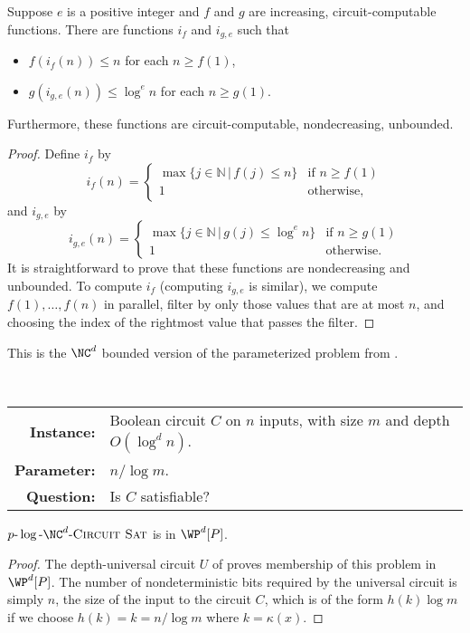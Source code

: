 \documentclass{article}
\newcommand{\dash}{\textnormal{-}}
\newcommand{\pncsat}{p\dash\log\dash\NC^d\dash\textsc{Circuit Sat}}
\begin{document}
\begin{lemma}\label{lem:i}
  Suppose $e$ is a positive integer and $f$ and $g$ are increasing, circuit-computable functions.
  There are functions $i_f$ and $i_{g, e}$ such that
  \begin{itemize}
  \item $f(i_f(n)) \leq n$ for each $n \geq f(1)$,
  \item $g(i_{g, e}(n)) \leq \log^e n$ for each $n \geq g(1)$.
  \end{itemize}
  Furthermore, these functions are circuit-computable, nondecreasing, unbounded.
\end{lemma}
\begin{proof}
  Define $i_f$ by
  \[
  i_f(n) = \begin{cases}
    \max\{ j \in \mathbb{N} \, | \, f(j) \leq n\} & \text{if } n \geq f(1) \\
    1 & \text{otherwise},
  \end{cases}
  \]
  and $i_{g, e}$ by
  \[
  i_{g, e}(n) = \begin{cases}
    \max\{ j \in \mathbb{N} \, | \, g(j) \leq \log^e n\} & \text{if } n \geq g(1) \\
    1 & \text{otherwise}.
  \end{cases}
  \]
  It is straightforward to prove that these functions are nondecreasing and unbounded.
  To compute $i_f$ (computing $i_{g, e}$ is similar), we compute $f(1), \dotsc, f(n)$ in parallel, filter by only those values that are at most $n$, and choosing the index of the rightmost value that passes the filter.
\end{proof}

This is the $\NC^d$ bounded version of the parameterized problem from \autocite[Lemma~3.26]{fg06}.

\begin{definition}[$\pncsat$]
  \mbox{} \\
  \begin{tabular}{r p{9.2cm}}
    \textbf{Instance:} & Boolean circuit $C$ on $n$ inputs, with size $m$ and depth $O(\log^d n)$. \\
    \textbf{Parameter:} & $n / \log m$. \\
    \textbf{Question:} & Is $C$ satisfiable?
  \end{tabular}
\end{definition}

\begin{lemma}
  $\pncsat$ is in $\WP^d[P]$.
\end{lemma}
\begin{proof}
  The depth-universal circuit $U$ of \autocite{ch85} proves membership of this problem in $\WP^d[P]$.
  The number of nondeterministic bits required by the universal circuit is simply $n$, the size of the input to the circuit $C$, which is of the form $h(k) \log m$ if we choose $h(k) = k = n / \log m$ where $k = \kappa(x)$.
\end{proof}
\end{document}
